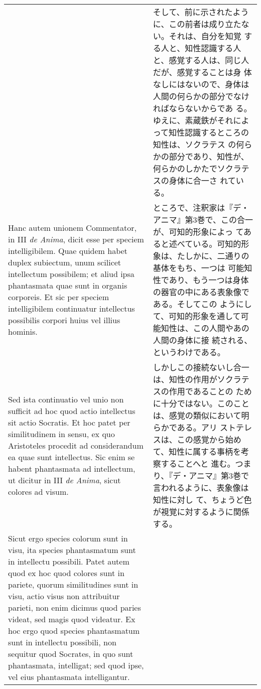 \documentclass[paper=a4paper,fontsize=10pt,jafontsize=9pt,titlepage]{jlreq}
\begin{document}
\begin{longtable}{p{21em}p{21em}}
&

そして、前に示されたように、この前者は成り立たない。それは、自分を知覚
する人と、知性認識する人と、感覚する人は、同じ人だが、感覚することは身
体なしにはないので、身体は人間の何らかの部分でなければならないからであ
る。ゆえに、素蔵鉄がそれによって知性認識するところの知性は、ソクラテス
の何らかの部分であり、知性が、何らかのしかたでソクラテスの身体に合一さ
れている。
 
\\



Hanc autem unionem Commentator, in III {\itshape de Anima}, dicit esse
per speciem intelligibilem. Quae quidem habet duplex subiectum, unum
scilicet intellectum possibilem; et aliud ipsa phantasmata quae sunt
in organis corporeis. Et sic per speciem intelligibilem continuatur
intellectus possibilis corpori huius vel illius hominis.
 
&

ところで、注釈家は『デ・アニマ』第3巻で、この合一が、可知的形象によっ
てあると述べている。可知的形象は、たしかに、二通りの基体をもち、一つは
可能知性であり、もう一つは身体の器官の中にある表象像である。そしてこの
ようにして、可知的形象を通して可能知性は、この人間やあの人間の身体に接
続される、というわけである。
 
\\

 Sed ista continuatio vel unio non sufficit ad hoc quod actio
 intellectus sit actio Socratis. Et hoc patet per similitudinem in
 sensu, ex quo Aristoteles procedit ad considerandum ea quae sunt
 intellectus. Sic enim se habent phantasmata ad intellectum, ut
 dicitur in III {\itshape de Anima}, sicut colores ad visum.
 
&

 しかしこの接続ないし合一は、知性の作用がソクラテスの作用であることの
 ために十分ではない。このことは、感覚の類似において明らかである。アリ
 ストテレスは、この感覚から始めて、知性に属する事柄を考察することへと
 進む。つまり、『デ・アニマ』第3巻で言われるように、表象像は知性に対し
 て、ちょうど色が視覚に対するように関係する。
 
\\


 Sicut ergo species colorum sunt in visu, ita species phantasmatum
 sunt in intellectu possibili. Patet autem quod ex hoc quod colores
 sunt in pariete, quorum similitudines sunt in visu, actio visus non
 attribuitur parieti, non enim dicimus quod paries videat, sed magis
 quod videatur. Ex hoc ergo quod species phantasmatum sunt in
 intellectu possibili, non sequitur quod Socrates, in quo sunt
 phantasmata, intelligat; sed quod ipse, vel eius phantasmata
 intelligantur.
 

\end{longtable}
\end{document}
